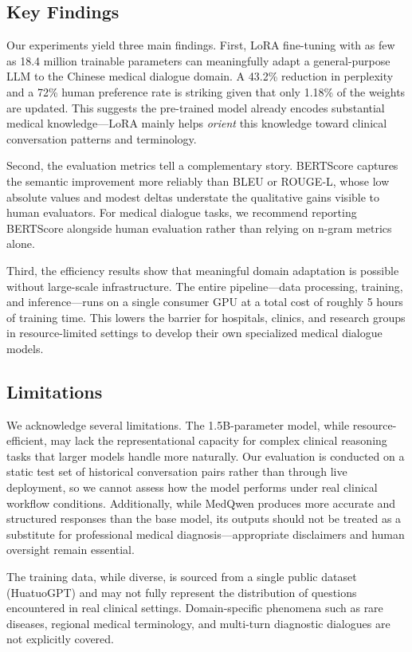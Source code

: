 \documentclass[12pt,a4paper]{article}
\begin{document}
\subsection{Key Findings}

Our experiments yield three main findings. First, LoRA fine-tuning with as few as 18.4 million trainable parameters can meaningfully adapt a general-purpose LLM to the Chinese medical dialogue domain. A 43.2\% reduction in perplexity and a 72\% human preference rate is striking given that only 1.18\% of the weights are updated. This suggests the pre-trained model already encodes substantial medical knowledge---LoRA mainly helps \textit{orient} this knowledge toward clinical conversation patterns and terminology.

Second, the evaluation metrics tell a complementary story. BERTScore captures the semantic improvement more reliably than BLEU or ROUGE-L, whose low absolute values and modest deltas understate the qualitative gains visible to human evaluators. For medical dialogue tasks, we recommend reporting BERTScore alongside human evaluation rather than relying on n-gram metrics alone.

Third, the efficiency results show that meaningful domain adaptation is possible without large-scale infrastructure. The entire pipeline---data processing, training, and inference---runs on a single consumer GPU at a total cost of roughly 5 hours of training time. This lowers the barrier for hospitals, clinics, and research groups in resource-limited settings to develop their own specialized medical dialogue models.

\subsection{Limitations}

We acknowledge several limitations. The 1.5B-parameter model, while resource-efficient, may lack the representational capacity for complex clinical reasoning tasks that larger models handle more naturally. Our evaluation is conducted on a static test set of historical conversation pairs rather than through live deployment, so we cannot assess how the model performs under real clinical workflow conditions. Additionally, while MedQwen produces more accurate and structured responses than the base model, its outputs should not be treated as a substitute for professional medical diagnosis---appropriate disclaimers and human oversight remain essential.

The training data, while diverse, is sourced from a single public dataset (HuatuoGPT) and may not fully represent the distribution of questions encountered in real clinical settings. Domain-specific phenomena such as rare diseases, regional medical terminology, and multi-turn diagnostic dialogues are not explicitly covered.
\end{document}
